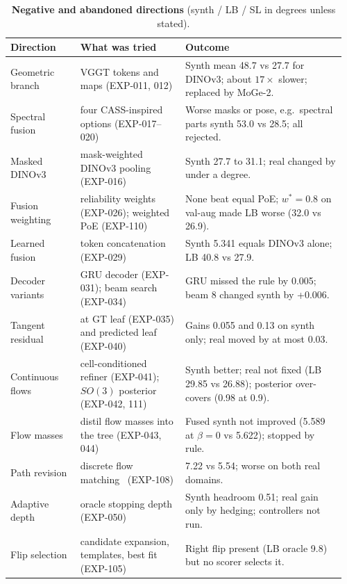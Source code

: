 \begin{table}[t]
  \centering\footnotesize
  \setlength{\tabcolsep}{3pt}
  \caption{\textbf{Negative and abandoned directions} (synth / LB / SL in degrees unless stated).}
  \label{app:z_tab_neg}
  \begin{tabular}{@{}p{0.2\linewidth}p{0.3\linewidth}p{0.46\linewidth}@{}}
    \toprule
    \raggedright Direction & \raggedright What was tried & \raggedright Outcome\tabularnewline
    \midrule
    \raggedright Geometric branch & \raggedright VGGT tokens and maps (EXP-011, 012) & \raggedright Synth mean 48.7 vs 27.7 for DINOv3; about $17\times$ slower; replaced by MoGe-2.\tabularnewline
    \raggedright Spectral fusion & \raggedright four CASS-inspired options (EXP-017--020) & \raggedright Worse masks or pose, e.g.\ spectral parts synth 53.0 vs 28.5; all rejected.\tabularnewline
    \raggedright Masked DINOv3 & \raggedright mask-weighted DINOv3 pooling (EXP-016) & \raggedright Synth 27.7 to 31.1; real changed by under a degree.\tabularnewline
    \raggedright Fusion weighting & \raggedright reliability weights (EXP-026); weighted PoE (EXP-110) & \raggedright None beat equal PoE; $w^*=0.8$ on val-aug made LB worse (32.0 vs 26.9).\tabularnewline
    \raggedright Learned fusion & \raggedright token concatenation (EXP-029) & \raggedright Synth 5.341 equals DINOv3 alone; LB 40.8 vs 27.9.\tabularnewline
    \raggedright Decoder variants & \raggedright GRU decoder (EXP-031); beam search (EXP-034) & \raggedright GRU missed the rule by 0.005; beam 8 changed synth by +0.006.\tabularnewline
    \raggedright Tangent residual & \raggedright at GT leaf (EXP-035) and predicted leaf (EXP-040) & \raggedright Gains 0.055 and 0.13 on synth only; real moved by at most 0.03.\tabularnewline
    \raggedright Continuous flows & \raggedright cell-conditioned refiner (EXP-041); $SO(3)$ posterior (EXP-042, 111) & \raggedright Synth better; real not fixed (LB 29.85 vs 26.88); posterior over-covers (0.98 at 0.9).\tabularnewline
    \raggedright Flow masses & \raggedright distil flow masses into the tree (EXP-043, 044) & \raggedright Fused synth not improved (5.589 at $\beta{=}0$ vs 5.622); stopped by rule.\tabularnewline
    \raggedright Path revision & \raggedright discrete flow matching~\cite{gat2024dfm} (EXP-108) & \raggedright 7.22 vs 5.54; worse on both real domains.\tabularnewline
    \raggedright Adaptive depth & \raggedright oracle stopping depth (EXP-050) & \raggedright Synth headroom 0.51; real gain only by hedging; controllers not run.\tabularnewline
    \raggedright Flip selection & \raggedright candidate expansion, templates, best fit (EXP-105) & \raggedright Right flip present (LB oracle 9.8) but no scorer selects it.\tabularnewline

\end{tabular}
\end{table}
